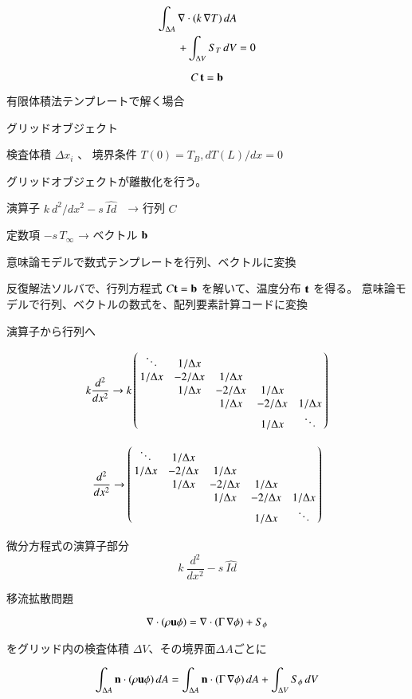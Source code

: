 \documentclass[a4j,11pt]{jarticle}
\begin{document}
\begin{eqnarray}
 \int_{\Delta A} {\bf \nabla} \cdot ( k \,  {\bf \nabla} T )\, dA & \\
+  \int_{\Delta V} S_T \,dV &  = 0  \\ 
\end{eqnarray}

 
\medskip

\[ C \,{\bf t} = {\bf b} \]


有限体積法テンプレートで解く場合

    グリッドオブジェクト

        検査体積 \( \Delta x_i\) 、 境界条件 \( T(0) = T_B , d T(L) / dx = 0 \)

    グリッドオブジェクトが離散化を行う。

        演算子 \(  k\ d^2 / dx^2 - s\ \hat{Id} \)　→ 行列 \(C\)

        定数項 \( - s \, T_\infty \) → ベクトル \( \bf b \)

            意味論モデルで数式テンプレートを行列、ベクトルに変換

    反復解法ソルバで、行列方程式 \( C {\bf t} = {\bf b} \) を解いて、温度分布 \( \bf t\) を得る。
        意味論モデルで行列、ベクトルの数式を、配列要素計算コードに変換



演算子から行列へ
 

\[ k \frac{ d^2 }{ dx^2} \rightarrow  k \left( \begin{array}{@{\,}ccccc@{\,}} \ddots & 1 / \Delta x & & & \\ 1 / \Delta x & - 2 / \Delta x & 1 / \Delta x & & \\ & 1 / \Delta x & - 2 / \Delta x & 1 / \Delta x & \\ & & 1 / \Delta x & - 2 / \Delta x & 1 / \Delta x \\ & & & 1 / \Delta x & \ddots \end{array} \right)  \]


\[  \frac{ d^2 }{ dx^2} \rightarrow  \left( \begin{array}{@{\,}ccccc@{\,}} \ddots & 1 / \Delta x & & & \\ 1 / \Delta x & - 2 / \Delta x & 1 / \Delta x & & \\ & 1 / \Delta x & - 2 / \Delta x & 1 / \Delta x & \\ & & 1 / \Delta x & - 2 / \Delta x & 1 / \Delta x \\ & & & 1 / \Delta x & \ddots \end{array} \right)  \]


微分方程式の演算子部分
 \[  k\ \frac{d^2}{dx^2} - s\ \hat{Id} \]
 


移流拡散問題

\[ {\bf \nabla} \cdot ( \rho {\bf u} \phi) = {\bf \nabla} \cdot ( \Gamma \, {\bf \nabla} \phi )  + S_\phi \]

をグリッド内の検査体積 \(\Delta V\)、その境界面\(\Delta A\)ごとに

\[ \int_{\Delta A} {\bf n} \cdot ( \rho {\bf u} \phi )\, dA = \int_{\Delta A} {\bf n} \cdot ( \Gamma \,  {\bf \nabla} \phi )\, dA + \int_{\Delta V} S_\phi \,dV  \]
 
\end{document}
